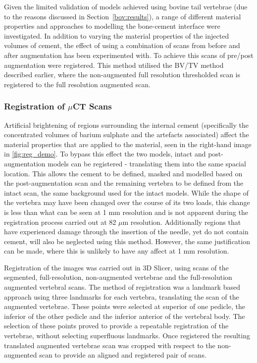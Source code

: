 Given the limited validation of models achieved using bovine tail vertebrae
(due to the reasons discussed in Section~\ref{bov:results}), a range of
different material properties and approaches to modelling the bone-cement
interface were investigated.
In addition to varying the material properties of the injected volumes of
cement, the effect of using a combination of scans from before and after
augmentation has been experimented with.
To achieve this scans of pre/post augmentation were registered.
This method utilised the BV/TV method described earlier, where the
non-augmented full resolution thresholded scan is registered to the full
resolution augmented scan.

\subsubsection{Registration of $\mu$CT Scans}

Artificial brightening of regions surrounding the internal cement (specifically
the concentrated volumes of barium sulphate and the artefacts associated)
affect the material properties that are applied to the material, seen in the
right-hand image in \cref{fig:reg_demo}.
To bypass this effect the two models, intact and post-augmentation models can
be registered - translating them into the same spacial location.
This allows the cement to be defined, masked and modelled based on the
post-augmentation scan and the remaining vertebra to be defined from the intact
scan, the same background used for the intact models.
While the shape of the vertebra may have been changed over the course of its
two loads, this change is less than what can be seen at 1 mm resolution and is
not apparent during the registration process carried out at 82 $\mu$m
resolution.
Additionally regions that have experienced damage through the insertion of the
needle, yet do not contain cement, will also be neglected using this method.
However, the same justification can be made, where this is unlikely to have any
affect at 1 mm resolution.

Registration of the images was carried out in 3D Slicer, using scans of the
segmented, full-resolution, non-augmented vertebrae and the full-resolution
augmented vertebral scans.
The method of registration was a landmark based approach using three landmarks
for each vertebra, translating the scan of the augmented vertebrae.
These points were selected at superior of one pedicle, the inferior of the
other pedicle and the inferior anterior of the vertebral body.
The selection of these points proved to provide a repeatable registration of
the vertebrae, without selecting superfluous landmarks.
Once registered the resulting translated augmented vertebrae scan was cropped
with respect to the non-augmented scan to provide an aligned and registered
pair of scans.

